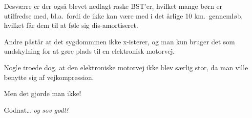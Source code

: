 \documentclass[10pt]{article}
\begin{document}
\begin{sketch}
 Desværre er der også blevet nedlagt raske BST'er, hvilket mange
børn er utilfredse med, bl.a.\ fordi de ikke kan være med i det årlige 10
km.\ gennemløb, hvilket får dem til at føle sig dis-amortiseret.

 Andre påstår at det sygdommmen ikke x-isterer, og man kun
bruger det som undskylning for at gøre plads til en elektronisk motorvej.

 Nogle troede dog, at den elektroniske motorvej ikke blev særlig
stor, da man ville benytte sig af vejkompression.

 Men det gjorde man ikke!

 Godnat\ldots
{} {\em og sov godt!}

\end{sketch}
\end{document}

